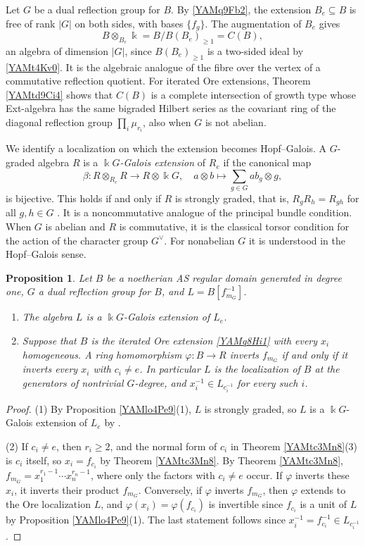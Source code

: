 \documentclass[reqno]{amsart}
\numberwithin{equation}{section}
\newtheorem{proposition}[equation]{Proposition}
\theoremstyle{definition}
\theoremstyle{remark}
\theoremstyle{plain}
\newcommand{\kk}{\Bbbk}
\begin{document}
Let $G$ be a dual reflection group for $B$. By \eqref{YAMq9Fb2}, the extension $B_e\subseteq B$ is free of rank $|G|$ on both sides, with bases $\{f_g\}$. The augmentation of $B_e$ gives
\[
B\otimes_{B_e}\kk=B/B(B_e)_{\ge1}=C(B),
\]
an algebra of dimension $|G|$, since $B(B_e)_{\ge1}$ is a two-sided ideal by \eqref{YAMt4Kv0}. It is the algebraic analogue of the fibre over the vertex of a commutative reflection quotient. For iterated Ore extensions, Theorem \ref{YAMtd9Ci4} shows that $C(B)$ is a complete intersection of growth type whose Ext-algebra has the same bigraded Hilbert series as the covariant ring of the diagonal reflection group $\prod_i\mu_{r_i}$, also when $G$ is not abelian.

We identify a localization on which the extension becomes Hopf--Galois. A $G$-graded algebra $R$ is a \emph{$\kk G$-Galois extension} of $R_e$ if the canonical map
\[
\beta\colon R\otimes_{R_e}R\longrightarrow R\otimes\kk G,\quad a\otimes b\longmapsto\sum_{g\in G}ab_g\otimes g,
\]
is bijective. This holds if and only if $R$ is strongly graded, that is, $R_gR_h=R_{gh}$ for all $g,h\in G$ \cite[Theorem 8.1.7]{Mon}. It is a noncommutative analogue of the principal bundle condition. When $G$ is abelian and $R$ is commutative, it is the classical torsor condition for the action of the character group $G^\vee$. For nonabelian $G$ it is understood in the Hopf--Galois sense.

\begin{proposition}\label{YAMp12Gl3}
Let $B$ be a noetherian AS regular domain generated in degree one, $G$ a dual reflection group for $B$, and $L=B[f_{m_G}^{-1}]$.
\begin{enumerate}
\item The algebra $L$ is a $\kk G$-Galois extension of $L_e$.
\item Suppose that $B$ is the iterated Ore extension \eqref{YAMq8Hi1} with every $x_i$ homogeneous. A ring homomorphism $\varphi\colon B\to R$ inverts $f_{m_G}$ if and only if it inverts every $x_i$ with $c_i\neq e$. In particular $L$ is the localization of $B$ at the generators of nontrivial $G$-degree, and $x_i^{-1}\in L_{c_i^{-1}}$ for every such $i$.
\end{enumerate}
\end{proposition}

\begin{proof}
(1) By Proposition \ref{YAMlo4Pe9}(1), $L$ is strongly graded, so $L$ is a $\kk G$-Galois extension of $L_e$ by \cite[Theorem 8.1.7]{Mon}.

(2) If $c_i\neq e$, then $r_i\ge2$, and the normal form of $c_i$ in Theorem \ref{YAMtc3Mn8}(3) is $c_i$ itself, so $x_i=f_{c_i}$ by Theorem \ref{YAMtc3Mn8}. By Theorem \ref{YAMtc3Mn8}, $f_{m_G}=x_1^{r_1-1}\cdots x_n^{r_n-1}$, where only the factors with $c_i\neq e$ occur. If $\varphi$ inverts these $x_i$, it inverts their product $f_{m_G}$. Conversely, if $\varphi$ inverts $f_{m_G}$, then $\varphi$ extends to the Ore localization $L$, and $\varphi(x_i)=\varphi(f_{c_i})$ is invertible since $f_{c_i}$ is a unit of $L$ by Proposition \ref{YAMlo4Pe9}(1). The last statement follows since $x_i^{-1}=f_{c_i}^{-1}\in L_{c_i^{-1}}$.
\end{proof}
\end{document}
